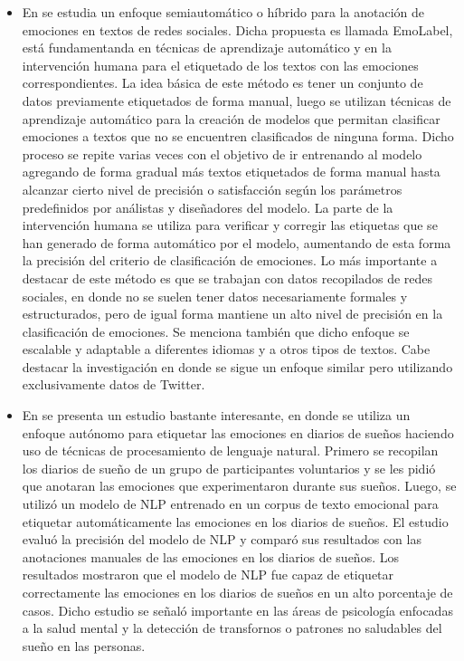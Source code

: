 \documentclass[12pt, conference]{IEEEtran}
\begin{document}
\begin{itemize}
 \item En \cite{f4} se estudia un enfoque semiautomático o híbrido para la anotación de emociones en textos de redes sociales. Dicha propuesta es llamada EmoLabel, está fundamentanda en técnicas de aprendizaje automático y en la intervención humana para el etiquetado de los textos con las emociones correspondientes. La idea básica de este método es tener un conjunto de datos previamente etiquetados de forma manual, luego se utilizan técnicas de aprendizaje automático para la creación de modelos que permitan clasificar emociones a textos que no se encuentren clasificados de ninguna forma. Dicho proceso se repite varias veces con el objetivo de ir entrenando al modelo agregando de forma gradual más textos etiquetados de forma manual hasta alcanzar cierto nivel de precisión o satisfacción según los parámetros predefinidos por análistas y diseñadores del modelo. La parte de la intervención humana se utiliza para verificar y corregir las etiquetas que se han generado de forma automático por el modelo, aumentando de esta forma la precisión del criterio de clasificación de emociones. Lo más importante a destacar de este método es que se trabajan con datos recopilados de redes sociales, en donde no se suelen tener datos necesariamente formales y estructurados, pero de igual forma mantiene un alto nivel de precisión en la clasificación de emociones. Se menciona también que dicho enfoque se escalable y adaptable a diferentes idiomas y a otros tipos de textos. Cabe destacar la investigación \cite{f5} en donde se sigue un enfoque similar pero utilizando exclusivamente datos de Twitter.
 \item En \cite{f6} se presenta un estudio bastante interesante, en donde se utiliza un enfoque autónomo para etiquetar las emociones en diarios de sueños haciendo uso de técnicas de procesamiento de lenguaje natural. Primero se recopilan los diarios de sueño de un grupo de participantes voluntarios y se les pidió que anotaran las emociones que experimentaron durante sus sueños. Luego, se utilizó un modelo de NLP entrenado en un corpus de texto emocional para etiquetar automáticamente las emociones en los diarios de sueños. El estudio evaluó la precisión del modelo de NLP y comparó sus resultados con las anotaciones manuales de las emociones en los diarios de sueños. Los resultados mostraron que el modelo de NLP fue capaz de etiquetar correctamente las emociones en los diarios de sueños en un alto porcentaje de casos. Dicho estudio se señaló importante en las áreas de psicología enfocadas a la salud mental y la detección de transfornos o patrones no saludables del sueño en las personas.

\end{itemize}
\end{document}
